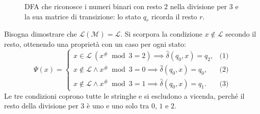 \documentclass[a4paper, 11pt, oneside]{book}
\theoremstyle{formale}
\begin{document}
    \begin{figure}[H]
        \centering
        \caption{DFA che riconosce i numeri binari con resto $2$ nella divisione per $3$ e
            la sua matrice di transizione: lo stato $q_r$ ricorda il resto $r$.}
        \label{fig:es-mod3}
    \end{figure}

    Bisogna dimostrare che $\mathcal{L}(\mathcal{M}) = \mathcal{L}$. Si scorpora la
    condizione $x \notin \mathcal{L}$ secondo il resto, ottenendo una propriet\`a con un
    caso per ogni stato:
    \begin{equation*}
        \Psi(x) =
        \begin{cases}
            x \in \mathcal{L}\ (x^\# \bmod 3 = 2) \implies \hat{\delta}(q_0, x) = q_2,
                & \text{(1)} \\
            x \notin \mathcal{L} \land x^\# \bmod 3 = 0 \implies \hat{\delta}(q_0, x) = q_0,
                & \text{(2)} \\
            x \notin \mathcal{L} \land x^\# \bmod 3 = 1 \implies \hat{\delta}(q_0, x) = q_1.
                & \text{(3)}
        \end{cases}
    \end{equation*}
    Le tre condizioni coprono tutte le stringhe e si escludono a vicenda, perch\'e il
    resto della divisione per $3$ \`e uno e uno solo tra $0$, $1$ e $2$.
\end{document}

